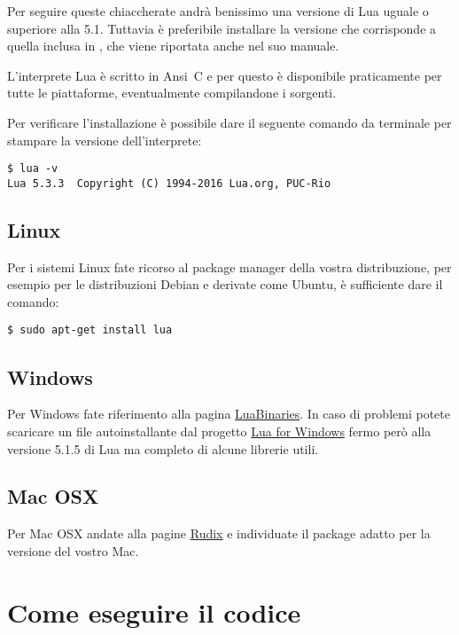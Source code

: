 Per seguire queste chiaccherate andrà benissimo una versione di Lua uguale o
superiore alla 5.1. Tuttavia è preferibile installare la versione che
corrisponde a quella inclusa in \LuaTeX{}, che viene riportata anche nel suo
manuale.

L'interprete Lua è scritto in Ansi~C e per questo è disponibile praticamente
per tutte le piattaforme, eventualmente compilandone i sorgenti.

Per verificare l'installazione è possibile dare il seguente comando da
terminale per stampare la versione dell'interprete:
\begin{Verbatim}
$ lua -v
Lua 5.3.3  Copyright (C) 1994-2016 Lua.org, PUC-Rio
\end{Verbatim}



\subsection{Linux}

Per i sistemi Linux fate ricorso al package manager della vostra distribuzione,
per esempio per le distribuzioni Debian e derivate come Ubuntu, è sufficiente
dare il comando:
\begin{Verbatim}
$ sudo apt-get install lua
\end{Verbatim}



\subsection{Windows}

Per Windows fate riferimento alla pagina
\href{http://luabinaries.sourceforge.net/index.html}{LuaBinaries}. In caso di
problemi potete scaricare un file autoinstallante dal progetto
\href{https://github.com/rjpcomputing/luaforwindows}{Lua for Windows} fermo
però alla versione 5.1.5 di Lua ma completo di alcune librerie utili.



\subsection{Mac OSX}

Per Mac OSX andate alla pagine \href{http://rudix.org/packages/lua.html}{Rudix}
e individuate il package adatto per la versione del vostro Mac.



\section{Come eseguire il codice}

